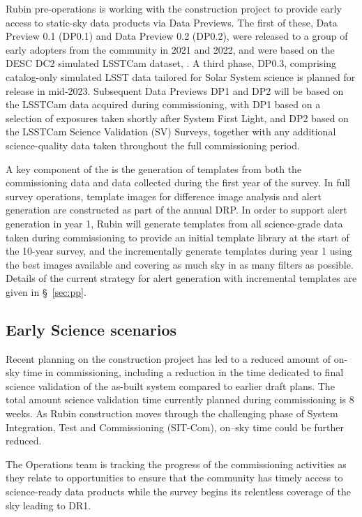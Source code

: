 Rubin pre-operations is working with the construction project to provide early access to static-sky data products via Data Previews.
The first of these, Data Preview 0.1 (DP0.1) and Data Preview 0.2 (DP0.2), were released to a group of early adopters from the community in 2021 and 2022, and were based on the DESC DC2 simulated LSSTCam dataset, \citep{2021ApJS..253...31L}.
A third phase, DP0.3, comprising catalog-only simulated LSST data tailored for Solar System science is planned for release in mid-2023.
Subsequent Data Previews DP1 and DP2 will be based on the LSSTCam data acquired during commissioning, with DP1 based on a selection of exposures taken shortly after System First Light, and DP2 based on the LSSTCam Science Validation (SV) Surveys, together with any additional science-quality data taken throughout the full commissioning period.

A key component of the \esp is the generation of templates from both the commissioning data and data collected during the first year of the survey.
In full survey operations, template images for difference image analysis and alert generation are constructed as part of the annual DRP.
In order to support alert generation in year 1, Rubin will generate templates from all science-grade data taken during commissioning to provide an initial template library at the start of the 10-year survey, and the incrementally generate templates during year 1 using the best images available and covering as much sky in as many filters as possible.
Details of the current strategy for alert generation  with incremental templates are given in  \S~\ref{sec:pp}.


\subsection{Early Science scenarios } \label{ssec:scenarios}

Recent planning on the construction project has led to a reduced amount of on-sky time in commissioning, including a reduction in the time dedicated to final science validation of the as-built system compared to earlier draft plans.
The total amount science validation time currently planned during commissioning is 8 weeks.
As Rubin construction moves through the challenging phase of System Integration, Test and Commissioning (SIT-Com), on--sky time could be further reduced.

The Operations team is tracking the progress of the commissioning activities as they relate to \es opportunities to ensure that the community has timely access to science-ready data products while the survey begins its relentless coverage of the sky leading to DR1.

